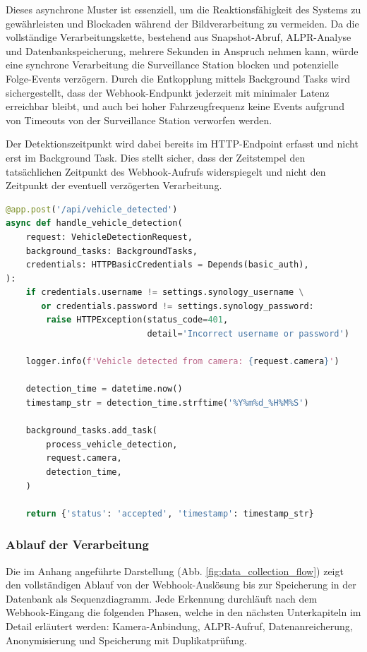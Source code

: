 Dieses asynchrone Muster ist essenziell, um die Reaktionsfähigkeit des Systems zu gewährleisten und Blockaden während der Bildverarbeitung zu vermeiden.
Da die vollständige Verarbeitungskette, bestehend aus Snapshot-Abruf, ALPR-Analyse und Datenbankspeicherung, mehrere Sekunden in Anspruch nehmen kann, würde eine synchrone Verarbeitung die Surveillance Station blocken und potenzielle Folge-Events verzögern.
Durch die Entkopplung mittels Background Tasks wird sichergestellt, dass der Webhook-Endpunkt jederzeit mit minimaler Latenz erreichbar bleibt, und auch bei hoher Fahrzeugfrequenz keine Events aufgrund von Timeouts von der Surveillance Station verworfen werden.

Der Detektionszeitpunkt wird dabei bereits im HTTP-Endpoint erfasst und nicht erst im Background Task.
Dies stellt sicher, dass der Zeitstempel den tatsächlichen Zeitpunkt des Webhook-Aufrufs widerspiegelt und nicht den Zeitpunkt der eventuell verzögerten Verarbeitung.

\begin{lstlisting}[language=Python, caption={Webhook-Endpunkt für Fahrzeugerkennung}, label={lst:webhook}]
@app.post('/api/vehicle_detected')
async def handle_vehicle_detection(
    request: VehicleDetectionRequest,
    background_tasks: BackgroundTasks,
    credentials: HTTPBasicCredentials = Depends(basic_auth),
):
    if credentials.username != settings.synology_username \
       or credentials.password != settings.synology_password:
        raise HTTPException(status_code=401,
                            detail='Incorrect username or password')

    logger.info(f'Vehicle detected from camera: {request.camera}')

    detection_time = datetime.now()
    timestamp_str = detection_time.strftime('%Y%m%d_%H%M%S')

    background_tasks.add_task(
        process_vehicle_detection,
        request.camera,
        detection_time,
    )

    return {'status': 'accepted', 'timestamp': timestamp_str}
\end{lstlisting}


\newpage
\subsubsection{Ablauf der Verarbeitung}

Die im Anhang angeführte Darstellung (Abb. \ref{fig:data_collection_flow}) zeigt den vollständigen Ablauf von der Webhook-Auslösung bis zur Speicherung in der Datenbank als Sequenzdiagramm.
Jede Erkennung durchläuft nach dem Webhook-Eingang die folgenden Phasen, welche in den nächsten Unterkapiteln im Detail erläutert werden:
Kamera-Anbindung, ALPR-Aufruf, Datenanreicherung, Anonymisierung und Speicherung mit Duplikatprüfung.

